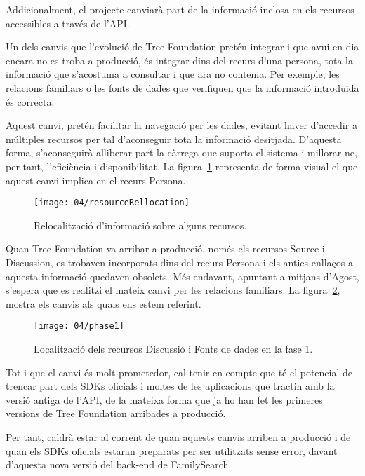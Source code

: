     Addicionalment, el projecte canviarà part de la informació inclosa en els recursos accessibles a través de l'API.

    Un dels canvis que l’evolució de Tree Foundation pretén integrar i que avui en dia encara no es troba a producció, és integrar dins del recurs d’una persona, tota la informació que s’acostuma a consultar i que ara no contenia. Per exemple, les relacions familiars o les fonts de dades que verifiquen que la informació introduïda és correcta.

    Aquest canvi, pretén facilitar la navegació per les dades, evitant haver d’accedir a múltiples recursos per tal d’aconseguir tota la informació desitjada. D'aquesta forma, s'aconseguirà alliberar part la càrrega que suporta el sistema i millorar-ne, per tant, l'eficiència i disponibilitat. La figura~\ref{ref:resources} representa de forma visual el que aquest canvi implica en el recurs Persona.

    \begin{figure}[h]
        \texttt{[image: 04/resourceRellocation]}
        \centering
        \caption{Relocalització d'informació sobre alguns recursos.\label{ref:resources}}
    \end{figure}

    Quan Tree Foundation va arribar a producció, només els recursos Source i Discussion, es trobaven incorporats dins del recurs Persona i els antics enllaços a aquesta informació quedaven obsolets. Més endavant, apuntant a mitjans d’Agost, s'espera que es realitzi el mateix canvi per les relacions familiars. La figura~\ref{ref:phase1}, mostra els canvis als quals ens estem referint.

    \begin{figure}[h]
        \texttt{[image: 04/phase1]}
        \centering
        \caption{Localització dels recursos Discussió i Fonts de dades en la fase 1.\label{ref:phase1}}
    \end{figure}

    Tot i que el canvi és molt prometedor, cal tenir en compte que té el potencial de trencar part dels SDKs oficials i moltes de les aplicacions que tractin amb la versió antiga de l'API, de la mateixa forma que ja ho han fet les primeres versions de Tree Foundation arribades a producció.

    Per tant, caldrà estar al corrent de quan aquests canvis arriben a producció i de quan els SDKs oficials estaran preparats per ser utilitzats sense error, davant d'aquesta nova versió del back-end de FamilySearch.
